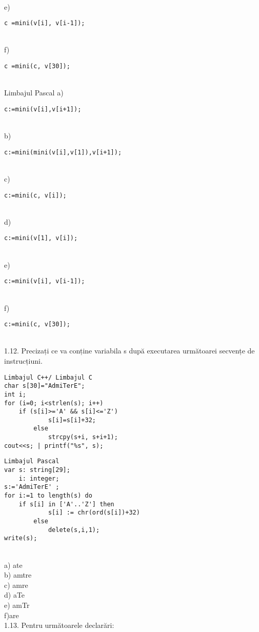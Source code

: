 \\
e) \begin{verbatim}
c =mini(v[i], v[i-1]);
\end{verbatim}
\\
f) \begin{verbatim}
c =mini(c, v[30]);
\end{verbatim}
\\
Limbajul Pascal
a) \begin{verbatim}
c:=mini(v[i],v[i+1]);
\end{verbatim}
\\
b) \begin{verbatim}
c:=mini(mini(v[i],v[1]),v[i+1]);
\end{verbatim}
\\
c) \begin{verbatim}
c:=mini(c, v[i]);
\end{verbatim}
\\
d) \begin{verbatim}
c:=mini(v[1], v[i]);
\end{verbatim}
\\
e) \begin{verbatim}
c:=mini(v[i], v[i-1]);
\end{verbatim}
\\
f) \begin{verbatim}
c:=mini(c, v[30]);
\end{verbatim}
\\
1.12. Precizați ce va conține variabila s după executarea următoarei secvențe de instrucțiuni.
\begin{verbatim}
Limbajul C++/ Limbajul C
char s[30]="AdmiTerE";
int i;
for (i=0; i<strlen(s); i++)
    if (s[i]>='A' && s[i]<='Z')
            s[i]=s[i]+32;
        else
            strcpy(s+i, s+i+1);
cout<<s; | printf("%s", s);
\end{verbatim}
\begin{verbatim}
Limbajul Pascal
var s: string[29];
    i: integer;
s:='AdmiTerE' ;
for i:=1 to length(s) do
    if s[i] in ['A'..'Z'] then
            s[i] := chr(ord(s[i])+32)
        else
            delete(s,i,1);
write(s);
\end{verbatim}
\\
a) ate
\\
b) amtre
\\
c) amre
\\
d) aTe
\\
e) amTr
\\
f)are
\\
1.13. Pentru următoarele declarări:
